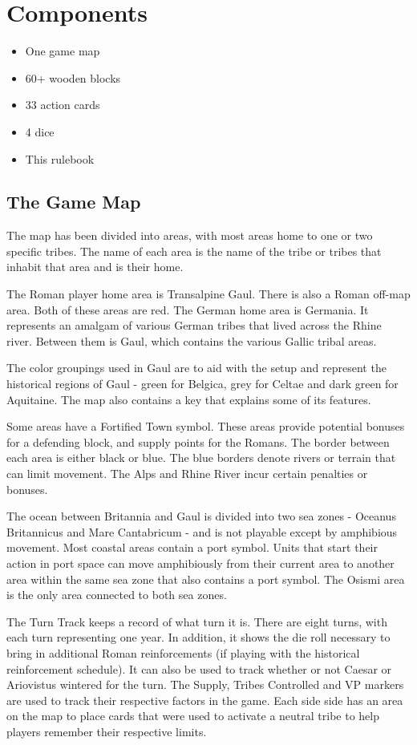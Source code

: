 \section{Components}

\begin{itemize}
  \setlength\itemsep{0em}
  \item One game map
  \item 60+ wooden blocks
  \item 33 action cards
  \item 4 dice
  \item This rulebook
\end{itemize}

\subsection{The Game Map}
The map has been divided into areas, with most areas home to one or two specific tribes. The name of each area is the name of the tribe or tribes that inhabit that area and is their home.

The Roman player home area is Transalpine Gaul. There is also a Roman off-map area. Both of these areas are red. The German home area is Germania. It represents an amalgam of various German tribes that lived across the Rhine river. Between them is Gaul, which contains the various Gallic tribal areas.

The color groupings used in Gaul are to aid with the setup and represent the historical regions of Gaul - green for Belgica, grey for Celtae and dark green for Aquitaine. The map also contains a key that explains some of its features.

Some areas have a Fortified Town symbol. These areas provide potential bonuses for a defending block, and supply points for the Romans. The border between each area is either black or blue. The blue borders denote rivers or terrain that can limit movement. The Alps and Rhine River incur certain penalties or bonuses.

The ocean between Britannia and Gaul is divided into two sea zones - Oceanus Britannicus and Mare Cantabricum - and is not playable except by amphibious movement. Most coastal areas contain a port symbol. Units that start their action in port space can move amphibiously from their current area to another area within the same sea zone that also contains a port symbol. The Osismi area is the only area connected to both sea zones.

The Turn Track keeps a record of what turn it is. There are eight turns, with each turn representing one year. In addition, it shows the die roll necessary to bring in additional Roman reinforcements (if playing with the historical reinforcement schedule). It can also be used to track whether or not Caesar or Ariovistus wintered for the turn. The Supply, Tribes Controlled and VP markers are used to track their respective factors in the game. Each side side has an area on the map to place cards that were used to activate a neutral tribe to help players remember their respective limits.

